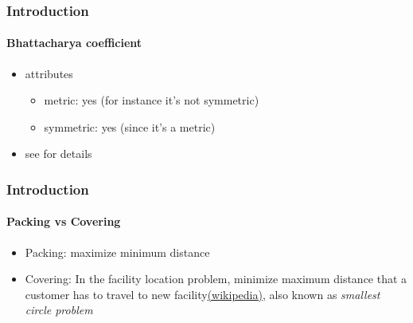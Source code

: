 \begin{frame}
\frametitle{Introduction}
\framesubtitle{Bhattacharya coefficient}
\logoCSIPCPL\mypagenum
	\begin{itemize}
		\item {\color {red} attributes}
			\begin{itemize}
				\item {\color {blue} metric}: yes (for instance it's not symmetric)
				\item {\color {blue} symmetric}: yes (since it's a metric)
			\end{itemize}
		\item see  for details
	\end{itemize}	
\end{frame}


\begin{frame}
\frametitle{Introduction}
\framesubtitle{Packing vs Covering}
\logoCSIPCPL\mypagenum
	\begin{itemize}
		\item Packing: maximize minimum distance
		\item Covering: In the facility location problem, minimize maximum distance that a customer has to travel to new facility{\color{blue}\href{http://en.wikipedia.org/wiki/Smallest_circle_problem}{(wikipedia)}}, also known as \emph{smallest circle problem}
	\end{itemize}	
\end{frame}


\printbibliography

